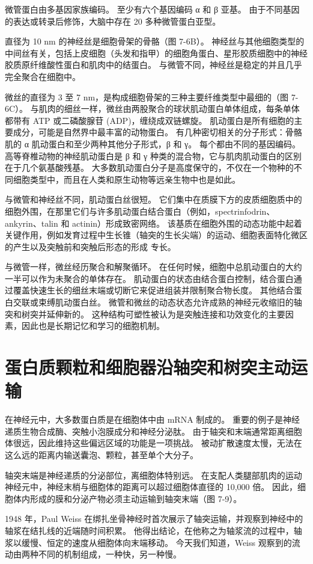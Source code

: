 微管蛋白由多基因家族编码。 至少有六个基因编码 α 和 β 亚基。 由于不同基因的表达或转录后修饰，大脑中存在 20 多种微管蛋白亚型。

直径为 10 nm 的神经丝是细胞骨架的骨骼（图 7-6B）。 神经丝与其他细胞类型的中间丝有关，包括上皮细胞（头发和指甲）的细胞角蛋白、星形胶质细胞中的神经胶质原纤维酸性蛋白和肌肉中的结蛋白。 与微管不同，神经丝是稳定的并且几乎完全聚合在细胞中。

微丝的直径为 3 至 7 nm，是构成细胞骨架的三种主要纤维类型中最细的（图 7-6C）。 与肌肉的细丝一样，微丝由两股聚合的球状肌动蛋白单体组成，每条单体都带有 ATP 或二磷酸腺苷 (ADP)，缠绕成双链螺旋。 肌动蛋白是所有细胞的主要成分，可能是自然界中最丰富的动物蛋白。 有几种密切相关的分子形式：骨骼肌的 α 肌动蛋白和至少两种其他分子形式，β 和 γ。 每个都由不同的基因编码。 高等脊椎动物的神经肌动蛋白是 β 和 γ 种类的混合物，它与肌肉肌动蛋白的区别在于几个氨基酸残基。 大多数肌动蛋白分子是高度保守的，不仅在一个物种的不同细胞类型中，而且在人类和原生动物等远亲生物中也是如此。

与微管和神经丝不同，肌动蛋白丝很短。 它们集中在质膜下方的皮质细胞质中的细胞外围，在那里它们与许多肌动蛋白结合蛋白（例如，spectrinfodrin、ankyrin、talin 和 actinin）形成致密网络。 该基质在细胞外围的动态功能中起着关键作用，例如发育过程中生长锥（轴突的生长尖端）的运动、细胞表面特化微区的产生以及突触前和突触后形态的形成 专长。

与微管一样，微丝经历聚合和解聚循环。 在任何时候，细胞中总肌动蛋白的大约一半可以作为未聚合的单体存在。 肌动蛋白的状态由结合蛋白控制，结合蛋白通过覆盖快速生长的细丝末端或切断它来促进组装并限制聚合物长度。 其他结合蛋白交联或束缚肌动蛋白丝。 微管和微丝的动态状态允许成熟的神经元收缩旧的轴突和树突并延伸新的。 这种结构可塑性被认为是突触连接和功效变化的主要因素，因此也是长期记忆和学习的细胞机制。


\section{蛋白质颗粒和细胞器沿轴突和树突主动运输}
在神经元中，大多数蛋白质是在细胞体中由 mRNA 制成的。 重要的例子是神经递质生物合成酶、突触小泡膜成分和神经分泌肽。 由于轴突和末端通常距离细胞体很远，因此维持这些偏远区域的功能是一项挑战。 被动扩散速度太慢，无法在这么远的距离内输送囊泡、颗粒，甚至单个大分子。

轴突末端是神经递质的分泌部位，离细胞体特别远。 在支配人类腿部肌肉的运动神经元中，神经末梢与细胞体的距离可以超过细胞体直径的 10,000 倍。 因此，细胞体内形成的膜和分泌产物必须主动运输到轴突末端（图 7-9）。

1948 年，Paul Weiss 在绑扎坐骨神经时首次展示了轴突运输，并观察到神经中的轴浆在结扎线的近端随时间积累。 他得出结论，在他称之为轴浆流的过程中，轴浆以缓慢、恒定的速度从细胞体向末端移动。 今天我们知道，Weiss 观察到的流动由两种不同的机制组成，一种快，另一种慢。

